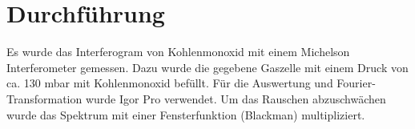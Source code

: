 %
%
\section{Durchführung}

Es wurde das Interferogram von Kohlenmonoxid mit einem Michelson Interferometer gemessen. Dazu wurde die gegebene Gaszelle mit einem Druck von ca. 130 mbar mit Kohlenmonoxid befüllt. Für die Auswertung und Fourier-Transformation wurde Igor Pro verwendet. Um das Rauschen abzuschwächen wurde das Spektrum mit einer Fensterfunktion (Blackman) multipliziert. 
%
